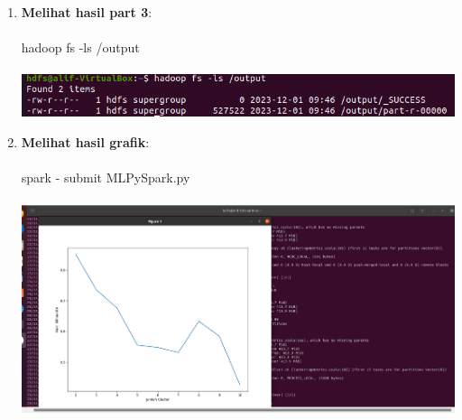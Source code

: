 \begin{enumerate}
\item \textbf {Melihat hasil part 3}: \\ \\
\colorbox{BurntOrange}{hadoop fs -ls /output} \\ \\
\includegraphics[scale=.4]{Gambar/enam} \\

\item \textbf {Melihat hasil grafik}: \\ \\
\colorbox{BurntOrange}{spark - submit MLPySpark.py} \\ \\
\includegraphics[scale=.4]{Gambar/tujuh} \\



    	
    	
 
    	
    	 	
    	
    	
    	
    	
    	
    	
    	
    	
    	
    	
    	
    	
    	
    	
    	
    	
    	
    	
    	
    	
    	
    	
    	
    	
    	
    	
    	
    	
    	
    	
    	

\end{enumerate}
